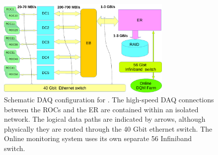 \begin{figure}[tbp]
\begin{center}
\includegraphics[width=0.75\textwidth]{figures/DAQ_coda.pdf}  
\caption{ \label{fig:CODA}
Schematic DAQ configuration for \gx. The high-speed DAQ connections between the ROCs and the ER are contained within an isolated network. The logical data paths are indicated by arrows,
although physically they are routed through the 40 Gbit ethernet switch.  The Online monitoring system uses its own separate 56 Infiniband switch.}

\end{center}
\end{figure}
